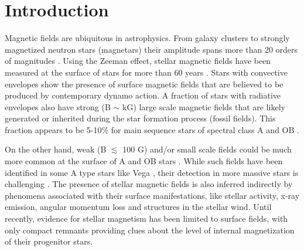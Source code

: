 \section{Introduction}
\label{intro}
Magnetic fields are ubiquitous in astrophysics. From  galaxy clusters to strongly magnetized neutron stars (magnetars) their amplitude spans more than 20 orders of magnitudes \citep{Brandenburg_2005}. Using the Zeeman effect, stellar magnetic fields have been measured at the surface of stars
for more than 60 years \citep{Babcock_1947,Landstreet_1992,Donati_2009}. Stars with convective envelopes show the presence of surface magnetic fields that are believed to be produced by contemporary dynamo action. A fraction of stars with radiative envelopes also have strong (B $\sim$ kG) large scale magnetic fields that are likely generated or inherited during the star formation process (fossil fields). This fraction appears to be 5-10\% for main sequence stars of spectral class A \citep[e.g.,][]{Auri_re_2004} and OB \citep{2012ASPC..464..405W}.

On the other hand, weak (B $\lesssim$ 100 G) and/or small scale fields could be much more common at the surface of A and OB stars \citep{Cantiello_2011,Braithwaite_2012}. While such fields have been identified in some A type stars like Vega \citep{Ligni_res_2009}, their detection in more massive stars is challenging \citep{2013A&A...554A..93K}. The presence of stellar magnetic fields is also inferred indirectly by phenomena associated with their surface manifestations, like stellar activity, x-ray emission, angular momentum loss and structures in the stellar wind. Until recently, evidence for stellar magnetism has been limited to surface fields, with only compact remnants providing clues about the level of internal magnetization of their progenitor stars.

